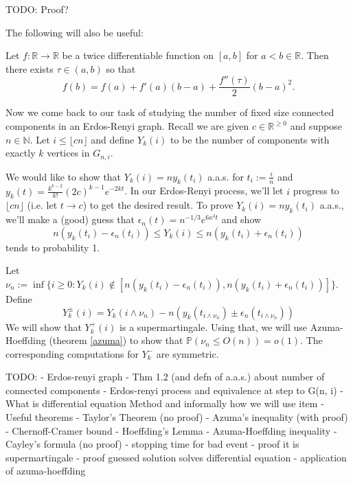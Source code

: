 TODO: Proof?

The following will also be useful:

\begin{theorem}
    Let \(f: \mathbb{R} \to \mathbb{R}\) be a twice differentiable function on \([a, b]\) for \(a < b \in \mathbb{R}\). Then there exists \(\tau \in (a, b)\) so that
    \[f(b) = f(a) + f'(a)(b-a) + \frac{f''(\tau)}{2}(b-a)^{2}.\]
\end{theorem}

Now we come back to our task of studying the number of fixed size connected components in an Erdos-Renyi graph. Recall we are given \(c \in
\mathbb{R}^{\geq 0}\) and suppose \(n \in \mathbb{N}\). Let \(i \leq \lfloor {cn} \rfloor\) and define \(Y_{k}(i)\) to be the number of components with exactly \(k\) vertices in \(G_{n, i}\).

We would like to show that \(Y_{k}(i) = n y_{k}(t_{i})\) a.a.s. for \(t_{i} := \frac{i}{n}\) and \(y_{k}(t) = \frac{k^{k-2}}{k!}(2c)^{k-1} e^{-2kt}\). In our Erdos-Renyi process, we'll let \(i\) progress to \(\lfloor {cn} \rfloor\) (i.e. let \(t \to c\)) to get the desired result. To prove \(Y_{k}(i) = n y_{k}(t_{i})\) a.a.s., we'll make a (good) guess that \(\epsilon_{n}(t) = n^{-1/3} e^{6 \kappa^{3} t}\) and show
\[n(y_{k}(t_{i}) - \epsilon_{n}(t_{i})) \leq Y_{k}(i) \leq n(y_{k}(t_{i}) + \epsilon_{n}(t_{i}))\]
tends to probability 1.

Let \(\nu_{n} := \inf\limits \{i \geq 0 : Y_{k}(i) \not\in [n(y_{k}(t_{i}) - \epsilon_{n}(t_{i})), n(y_{k}(t_{i}) + \epsilon_{n}(t_{i}))]\}\). Define
\[Y_{k}^{\pm}(i) = Y_{k}(i \wedge \nu_{n}) - n(y_{k}(t_{i \wedge \nu_{n}}) \pm \epsilon_{n}(t_{i \wedge \nu_{n}})) \]
We will show that \(Y_{k}^{+}(i)\) is a supermartingale. Using that, we will use Azuma-Hoeffding (theorem \ref{azuma}) to show that \(\mathbb{P}(\nu_{n} \leq O(n)) = o(1)\). The corresponding computations for \(Y_{k}^{-}\) are symmetric.







TODO:
- Erdos-renyi graph
- Thm 1.2 (and defn of a.a.s.) about number of connected components
- Erdos-renyi process and equivalence at step to G(n, i)
- What is differential equation Method and informally how we will use item
- Useful theorems
    - Taylor's Theorem (no proof)
    - Azuma's inequality (with proof)
        - Chernoff-Cramer bound
        - Hoeffding's Lemma
        - Azuma-Hoeffding inequality
    - Cayley's formula (no proof)
- stopping time for bad event
- proof it is supermartingale
- proof guessed solution solves differential equation
- application of azuma-hoeffding
